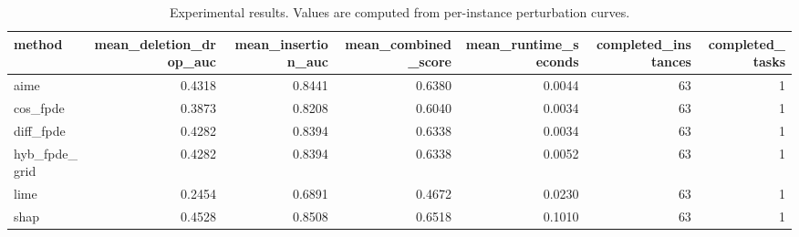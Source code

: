 \begin{table}[t]
\caption{Experimental results. Values are computed from per-instance perturbation curves.}
\label{tab:main_results_computed}
\centering
\begin{tabular}{lrrrrrr}
\toprule
method & mean\_deletion\_drop\_auc & mean\_insertion\_auc & mean\_combined\_score & mean\_runtime\_seconds & completed\_instances & completed\_tasks \\
\midrule
aime & 0.4318 & 0.8441 & 0.6380 & 0.0044 & 63 & 1 \\
cos\_fpde & 0.3873 & 0.8208 & 0.6040 & 0.0034 & 63 & 1 \\
diff\_fpde & 0.4282 & 0.8394 & 0.6338 & 0.0034 & 63 & 1 \\
hyb\_fpde\_grid & 0.4282 & 0.8394 & 0.6338 & 0.0052 & 63 & 1 \\
lime & 0.2454 & 0.6891 & 0.4672 & 0.0230 & 63 & 1 \\
shap & 0.4528 & 0.8508 & 0.6518 & 0.1010 & 63 & 1 \\
\bottomrule
\end{tabular}

\end{table}
